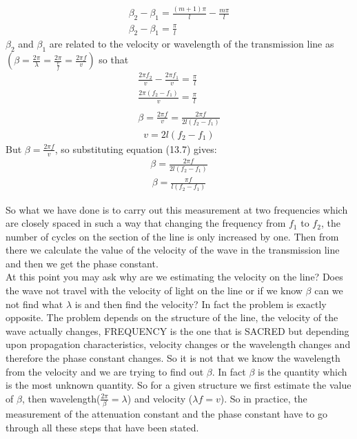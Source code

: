  \begin{align*}
  \beta_2 - \beta_1 = \frac{(m + 1)\pi}{l} - \frac{m\pi}{l}\\
\beta_2 - \beta_1 = \frac{\pi}{l}
\end{align*}
$\beta_2$ and $\beta_1$ are related to the velocity or wavelength of the transmission line as $( \beta = \frac{2\pi}{\lambda} = \frac{2\pi}{\frac{v}{f}} = \frac{2\pi f}{v})$ so that
\begin{align*}
\frac{2\pi f_2}{v} - \frac{2\pi f_1}{v} = \frac{\pi}{l}\\
\frac{2\pi(f_2 - f_1)}{v} = \frac{\pi}{l}\\
\\\beta = \frac{2\pi f}{v} = \frac{2\pi f}{2l(f_2 - f_1)}
\end{align*}
\begin{align}
v = 2l(f_2-f_1)
\end{align}
But $\beta = \frac{2\pi f}{v}$, so substituting equation (13.7) gives:
\begin{align*}
\beta = \frac{2\pi f}{2l(f_2 - f_1)}
\end{align*}
\begin{align}
     \beta = \frac{\pi f}{l(f_2 - f_1)}
\end{align}

So what we have done is to carry out this measurement at two frequencies which are closely spaced in such a way that changing the frequency from $f_1$ to $f_2$, the number of cycles on the section of the line is only increased by one. Then from there we calculate the value of the velocity of the wave in the transmission line and then we get the phase constant.\\

At this point you may ask why are we estimating the velocity on the line? Does the wave not travel with the velocity of light on the line or if we know $\beta$ can we not find what $\lambda$ is and then find the velocity? In fact the problem is exactly opposite. The problem depends on the structure of the line, the velocity of the wave actually changes, FREQUENCY is the one that is SACRED but depending upon propagation characteristics, velocity changes or the wavelength changes and therefore the phase constant changes. So it is not that we know the wavelength from the velocity and we are trying to find out $\beta$. In fact $\beta$ is the quantity which is the most unknown quantity. So for a given structure we first estimate the value of $\beta$, then wavelength($\frac{2\pi}{\beta}= \lambda$) and velocity ($\lambda f = v$). So in practice, the measurement of the attenuation constant and the phase constant have to go through all these steps that have been stated.\\

